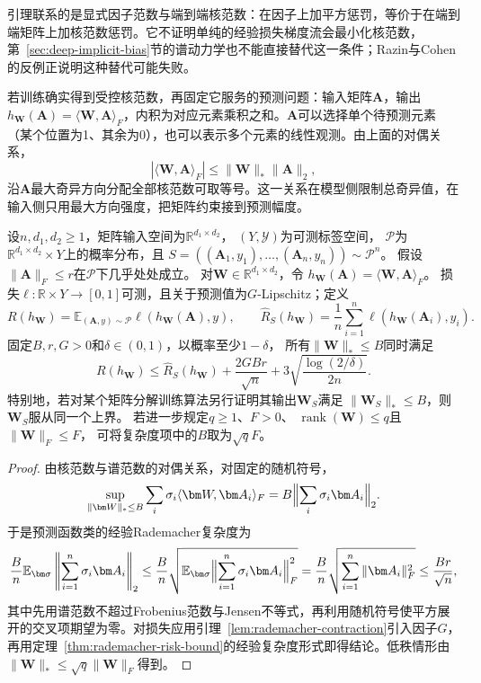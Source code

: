 引理联系的是显式因子范数与端到端核范数：在因子上加平方惩罚，等价于在端到端矩阵上加核范数惩罚。它不证明单纯的经验损失梯度流会最小化核范数，第~\ref{sec:deep-implicit-bias}节的谱动力学也不能直接替代这一条件；Razin与Cohen的反例正说明这种替代可能失败。

若训练确实得到受控核范数，再固定它服务的预测问题：输入矩阵$\bm A$，输出$h_{\bm W}(\bm A)=\langle\bm W,\bm A\rangle_F$，内积为对应元素乘积之和。$\bm A$可以选择单个待预测元素（某个位置为1、其余为0），也可以表示多个元素的线性观测。由上面的对偶关系，
\[
 |\langle\bm W,\bm A\rangle_F|\leq\|\bm W\|_*\|\bm A\|_2,
\]
沿$\bm A$最大奇异方向分配全部核范数可取等号。这一关系在模型侧限制总奇异值，在输入侧只用最大方向强度，把矩阵约束接到预测幅度。

\begin{theorem}[基于谱结构的矩阵预测期望风险]
\label{thm:nuclear-norm-generalization}
设$n,d_1,d_2\geq1$，矩阵输入空间为$\mathbb R^{d_1\times d_2}$，
$(Y,\mathcal Y)$为可测标签空间，
$\mathcal P$为$\mathbb R^{d_1\times d_2}\times Y$上的概率分布，且
$S=((\bm A_1,y_1),\ldots,(\bm A_n,y_n))\sim\mathcal P^n$。
假设$\|\bm A\|_F\leq r$在$\mathcal P$下几乎处处成立。
对$\bm W\in\mathbb R^{d_1\times d_2}$，令
$h_{\bm W}(\bm A)=\langle\bm W,\bm A\rangle_F$。
损失$\ell:\mathbb R\times Y\to[0,1]$可测，且关于预测值为$G$-Lipschitz；定义
\[
 R(h_{\bm W})=\mathbb E_{(\bm A,y)\sim\mathcal P}
                    \ell(h_{\bm W}(\bm A),y),\qquad
 \hat R_S(h_{\bm W})=\frac1n\sum_{i=1}^n
                    \ell(h_{\bm W}(\bm A_i),y_i).
\]
固定$B,r,G>0$和$\delta\in(0,1)$，以概率至少$1-\delta$，
所有$\|\bm W\|_*\leq B$同时满足
\[
 R(h_{\bm W})\leq\hat R_S(h_{\bm W})
       +\frac{2GBr}{\sqrt n}
       +3\sqrt{\frac{\log(2/\delta)}{2n}}.
\]
特别地，若对某个矩阵分解训练算法另行证明其输出$\bm W_S$满足
$\|\bm W_S\|_*\leq B$，则$\bm W_S$服从同一个上界。
若进一步规定$q\geq1$、$F>0$、
$\operatorname{rank}(\bm W)\leq q$且$\|\bm W\|_F\leq F$，
可将复杂度项中的$B$取为$\sqrt qF$。
\end{theorem}
\begin{proof}
由核范数与谱范数的对偶关系，对固定的随机符号，
\[
 \sup_{\|\bm W\|_*\leq B}\sum_i\sigma_i\langle\bm W,\bm A_i\rangle_F=B\Bigl\|\sum_i\sigma_i\bm A_i\Bigr\|_2.
\]
于是预测函数类的经验Rademacher复杂度为
\[
 \frac Bn\mathbb E_{\bm\sigma}
       \left\|\sum_{i=1}^n\sigma_i\bm A_i\right\|_2
 \leq\frac Bn\sqrt{\mathbb E_{\bm\sigma}\Bigl\|\sum_{i=1}^n\sigma_i\bm A_i\Bigr\|_F^2}
 =\frac Bn\sqrt{\sum_{i=1}^n\|\bm A_i\|_F^2}
 \leq\frac{Br}{\sqrt n},
\]
其中先用谱范数不超过Frobenius范数与Jensen不等式，再利用随机符号使平方展开的交叉项期望为零。对损失应用引理~\ref{lem:rademacher-contraction}引入因子$G$，再用定理~\ref{thm:rademacher-risk-bound}的经验复杂度形式即得结论。低秩情形由$\|\bm W\|_*\leq\sqrt q\|\bm W\|_F$得到。
\end{proof}

